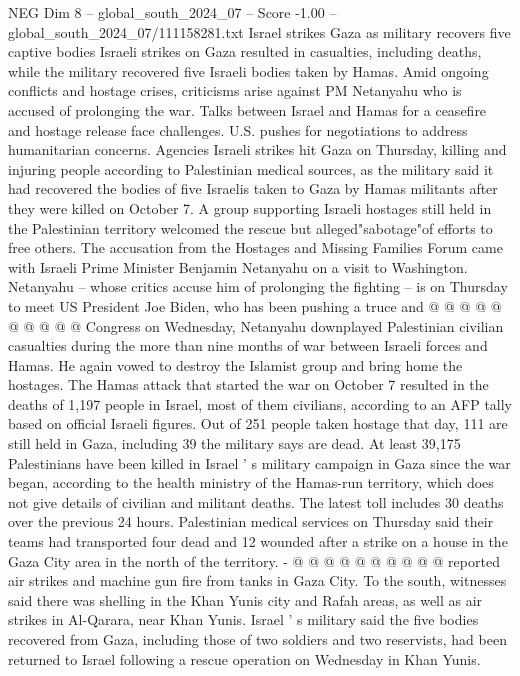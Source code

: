 \begin{textsample}{NEG Dim 8 – global\_south\_2024\_07 – Score -1.00 – global\_south\_2024\_07/111158281.txt}  \label{ex:f8_neg_117}
Israel strikes Gaza as military recovers five captive bodies Israeli strikes on Gaza resulted in casualties, including deaths, while the military recovered five Israeli bodies taken by Hamas.
Amid ongoing conflicts and hostage crises, criticisms arise against PM Netanyahu who is accused of prolonging the war.
Talks between Israel and Hamas for a ceasefire and hostage release face challenges.
U.S. pushes for negotiations to address humanitarian concerns.
Agencies Israeli strikes hit Gaza on Thursday, killing and injuring people according to Palestinian medical sources, as the military said it had recovered the bodies of five Israelis taken to Gaza by Hamas militants after they were killed on October 7.
A group supporting Israeli hostages still held in the Palestinian territory welcomed the rescue but alleged"sabotage"of efforts to free others.
The accusation from the Hostages and Missing Families Forum came with Israeli Prime Minister Benjamin Netanyahu on a visit to Washington.
Netanyahu -- whose critics accuse him of prolonging the fighting -- is on Thursday to meet US President Joe Biden, who has been pushing a truce and @ @ @ @ @ @ @ @ @ @ Congress on Wednesday, Netanyahu downplayed Palestinian civilian casualties during the more than nine months of war between Israeli forces and Hamas.
He again vowed to destroy the Islamist group and bring home the hostages.
The Hamas attack that started the war on October 7 resulted in the deaths of 1,197 people in Israel, most of them civilians, according to an AFP tally based on official Israeli figures.
Out of 251 people taken hostage that day, 111 are still held in Gaza, including 39 the military says are dead.
At least 39,175 Palestinians have been killed in Israel ' s military campaign in Gaza since the war began, according to the health ministry of the Hamas-run territory, which does not give details of civilian and militant deaths.
The latest toll includes 30 deaths over the previous 24 hours.
Palestinian medical services on Thursday said their teams had transported four dead and 12 wounded after a strike on a house in the Gaza City area in the north of the territory. - @ @ @ @ @ @ @ @ @ @ reported air strikes and machine gun fire from tanks in Gaza City.
To the south, witnesses said there was shelling in the Khan Yunis city and Rafah areas, as well as air strikes in Al-Qarara, near Khan Yunis.
Israel ' s military said the five bodies recovered from Gaza, including those of two soldiers and two reservists, had been returned to Israel following a rescue operation on Wednesday in Khan Yunis.

\end{textsample}
